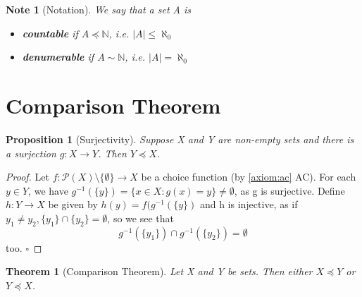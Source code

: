 \documentclass[11pt, oneside]{book}
\theoremstyle{break}
\newtheorem{thm}{Theorem}[section]
\newtheorem*{proof}{Proof}
\newtheorem{propo}{Proposition}[section]
\newtheorem*{note}{Note}
\newcommand{\bb}[1]{\mathbb{#1}}			%
\newcommand{\qed}{\hfill\ensuremath{\square}}	%
\begin{document}
\begin{note}[Notation]
	We say that a set A is
	\begin{itemize}
		\item \textbf{countable} if $A \preceq \bb{N}$, i.e. $|A| \leq \aleph_0$
		\item \textbf{denumerable} if $A \sim \bb{N}$, i.e. $|A| = \aleph_0$
	\end{itemize}
\end{note}

\section{Comparison Theorem}\label{sect:comparison_thm}

\begin{propo}[Surjectivity]
	Suppose X and Y are non-empty sets and there is a surjection $g: X \to Y$. Then $Y \preceq X$.
\end{propo}

\begin{proof}
	Let $f: \mathcal{P}(X) \setminus \{\emptyset\} \to X$ be a choice function (by \autoref{axiom:ac} AC). For each $y \in Y$, we have $g^{-1}(\{y\}) = \{x \in X : g(x) = y\} \neq \emptyset$, as g is surjective. Define $h: Y \to X$ be given by $h(y) = f(g^{-1}(\{y\})$ and h is injective, as if $y_1 \neq y_2, \{y_1\} \cap \{y_2\} = \emptyset$, so we see that
	\begin{equation}
		g^{-1}(\{y_1\}) \cap g^{-1}(\{y_2\}) = \emptyset
	\end{equation}
	too. \qed
\end{proof}

\begin{thm}[Comparison Theorem]
	Let X and Y be sets. Then either $X \preceq Y$ or $Y \preceq X$.
\end{thm}
\end{document}
